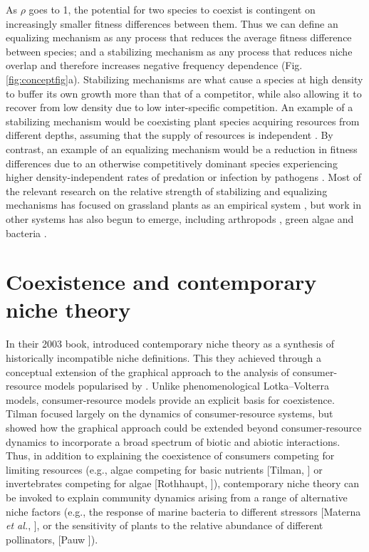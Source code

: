 \noindent As $\rho$ goes to 1, the potential for two species to coexist is contingent on increasingly smaller fitness differences between them. Thus we can define an equalizing mechanism as any process that reduces the average fitness difference between species; and a stabilizing mechanism as any process that reduces niche overlap and therefore increases negative frequency dependence (Fig. \ref{fig:conceptfig}a). Stabilizing mechanisms are what cause a species at high density to buffer its own growth more than that of a competitor, while also allowing it to recover from low density due to low inter-specific competition. An example of a stabilizing mechanism would be coexisting plant species acquiring resources from different depths, assuming that the supply of resources is independent \citep{Levine2009}. By contrast, an example of an equalizing mechanism would be a reduction in fitness differences due to an otherwise competitively dominant species experiencing higher density-independent rates of predation or infection by pathogens \citep{Mordecai2011}. Most of the relevant research on the relative strength of stabilizing and equalizing mechanisms has focused on grassland plants as an empirical system \citep[e.g.,][]{Levine2009, Angert2009, Adler2010, Godoy2014, Germain2016}, but work in other systems has also begun to emerge, including arthropods \citep{Siepielski2011}, green algae \citep{Narwani2013} and bacteria \citep{Zhao2015}.
\par
 
 
 
\section{Coexistence and contemporary niche theory}
In their 2003 book, \citet{Chase2003} introduced contemporary niche theory as a synthesis of historically incompatible niche definitions. This they achieved through a conceptual extension of the graphical approach to the analysis of consumer-resource models popularised by \citet{tilman1982}. Unlike phenomenological Lotka--Volterra models, consumer-resource models provide an explicit basis for coexistence. Tilman focused largely on the dynamics of consumer-resource systems, but \cite{Chase2003} showed how the graphical approach could be extended beyond consumer-resource dynamics to incorporate a broad spectrum of biotic and abiotic interactions. Thus, in addition to explaining the coexistence of consumers competing for limiting resources (e.g., algae competing for basic nutrients [Tilman, \citeyear{Tilman1977, tilman1982}] or invertebrates competing for algae [Rothhaupt, \citeyear{Rothhaupt1988}]), contemporary niche theory can be invoked to explain community dynamics arising from a range of alternative niche factors (e.g., the response of marine bacteria to different stressors [Materna \textit{et al.}, \citeyear{Materna2012}], or the sensitivity of plants to the relative abundance of different pollinators, [Pauw \citeyear{Pauw2013}]).  
\par


